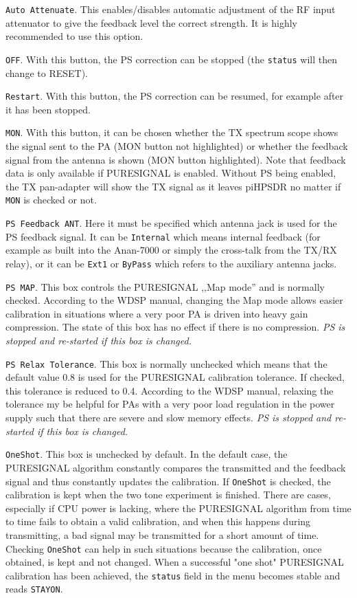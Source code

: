 \documentclass[12pt]{book}
\def\rett#1{\texttt{\color{red}#1}}
\def\bltt#1{\texttt{\color{blue}#1}}
\def\pH{pi\-HPSDR\xspace}
\begin{document}
\rett{Auto Attenuate}. This enables/disables automatic adjustment of the RF input
attenuator to give the feedback level the correct strength. It is highly recommended
to use this option.

\rett{OFF}. With this button, the PS correction can be stopped (the \rett{status} will
then change to RESET).

\rett{Restart}. With this button, the PS correction can be resumed, for example after
it has been stopped.

\rett{MON}. With this button, it can be chosen whether the TX spectrum scope shows
the signal sent to the PA (MON button not highlighted) or whether the feedback signal
from the antenna is shown (MON button highlighted). Note that feedback data is only
available if PURESIGNAL is enabled. Without PS being enabled, the TX pan-adapter will
show the TX signal as it leaves \pH no matter if \rett{MON} is checked or not.

\rett{PS Feedback ANT}. Here it must be specified which antenna jack is used for the
PS feedback signal. It can be \rett{Internal} which means internal feedback
(for example as built into the Anan-7000 or  simply the cross-talk from the
TX/RX relay), or it can be \rett{Ext1} or \rett{ByPass} which refers to the
auxiliary antenna jacks.

\rett{PS MAP}. This box controls the PURESIGNAL ,,Map mode'' and is normally checked.
According to the WDSP manual, changing the Map mode allows easier calibration in
situations where a very poor PA is driven into heavy gain compression. The state
of this box has
no effect if there is no compression. \textit{PS is stopped and re-started if
this box is changed.}

\rett{PS Relax Tolerance}. This box is normally unchecked which means that the default
value 0.8 is used for the PURESIGNAL calibration tolerance. If checked, this tolerance
is reduced to 0.4. According to the WDSP manual, relaxing the tolerance my be helpful
for PAs with a very poor load regulation in the power supply such that there are
severe and slow memory effects. \textit{PS is stopped and re-started if
this box is changed.}

\rett{OneShot}. This box is unchecked by default. In the default case, the PURESIGNAL
algorithm constantly compares the transmitted and the feedback signal and thus
constantly updates the calibration. If \rett{OneShot} is checked, the calibration
is kept when the two tone experiment is finished. There are cases, especially if
CPU power is lacking, where the PURESIGNAL algorithm from time to time fails to obtain
a valid calibration, and when this happens during transmitting, a bad signal may
be transmitted for a short amount of time. Checking \rett{OneShot} can help in such
situations because the calibration, once obtained, is kept and not changed.
When a successful "one shot" PURESIGNAL calibration has been achieved, the \bltt{status}
field in the menu becomes stable and reads \texttt{STAYON}.
\end{document}

